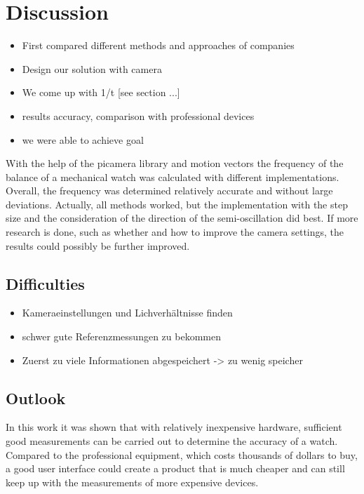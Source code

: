 \documentclass[12pt, a4paper]{report}
\begin{document}
    \chapter{Discussion}
             \begin{itemize}
    \item First compared different methods and approaches of companies
    \item Design our solution with camera
    \item We come up with 1/t [see section ...]
    \item results accuracy, comparison with professional devices
    \item we were able to achieve goal
    \end{itemize}
    With the help of the picamera library and motion vectors the frequency of the balance of a mechanical watch was calculated with different implementations. Overall, the frequency was determined relatively accurate and without large deviations. Actually, all methods worked, but the implementation with the step size and the consideration of the direction of the semi-oscillation did best. If more research is done, such as whether and how to improve the camera settings, the results could possibly be further improved. 
    
    \section{Difficulties}
    \begin{itemize}
    \item Kameraeinstellungen und Lichverhältnisse finden
    \item schwer gute Referenzmessungen zu bekommen
    \item Zuerst zu viele Informationen abgespeichert -> zu wenig speicher
    \end{itemize}
    
    \section{Outlook}
    In this work it was shown that with relatively inexpensive hardware, sufficient good measurements can be carried out to determine the accuracy of a watch. Compared to the professional equipment, which costs thousands of dollars to buy, a good user interface could create a product that is much cheaper and can still keep up with the measurements of more expensive devices. 
    
\end{document}
